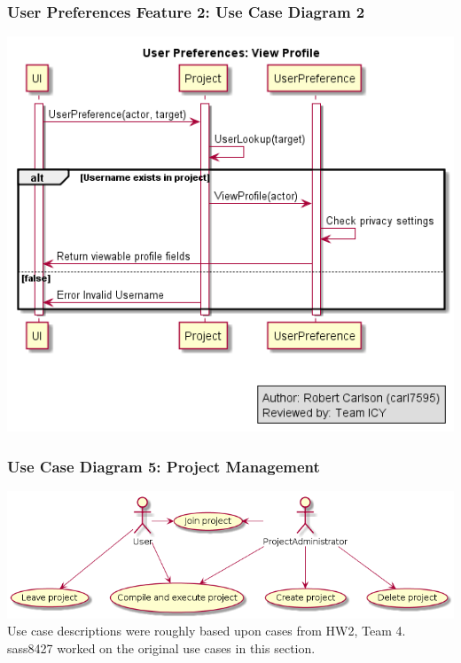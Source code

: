 \documentclass[twoside,letterpaper]{article}
\begin{document}
	\subsubsection[User Preferences Feature 2: Use Case Diagram 2]{\rmfamily\bfseries\color{black}
		User Preferences Feature 2: Use Case Diagram 2}
	\hypertarget{RefHeading22059017292}{}
	\bigskip
	
	\includegraphics[width=6.0in]{images/SequenceDiagrams/UserPreferencesViewProfile.png}
	
	\newpage
	
	
	\subsubsection[Use Case Diagram 5: Project Management (dani2918)]{\rmfamily\bfseries\color{black}
		Use Case Diagram 5: Project Management}
	
	\bigskip
		
		\includegraphics[width=6.0in]{images/UseCaseDiagrams/PMUCD} \vspace{5cm}
		\; \newline
		Use case descriptions were roughly based upon cases from HW2, Team 4. sass8427 worked on the original use cases in this section.\newline
	
\end{document}

